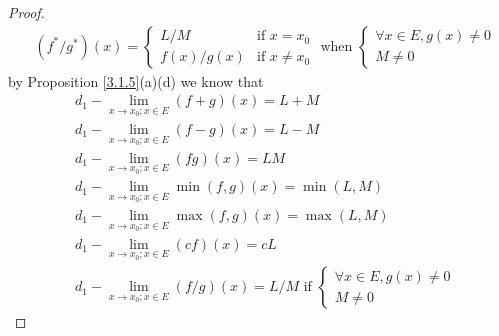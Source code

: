 \begin{proof}
\begin{align*}
                                      & (f^* / g^*)(x) = \begin{cases}
                                                             L / M       & \text{if } x = x_0    \\
                                                             f(x) / g(x) & \text{if } x \neq x_0
                                                         \end{cases} \text{ when } \begin{cases}
                                                                                       \forall x \in E, g(x) \neq 0 \\
                                                                                       M \neq 0
                                                                                   \end{cases}
    \end{align*}
    by Proposition \ref{3.1.5}(a)(d) we know that
    \begin{align*}
         & d_1 - \lim_{x \to x_0 ; x \in E} (f + g)(x) = L + M                                          \\
         & d_1 - \lim_{x \to x_0 ; x \in E} (f - g)(x) = L - M                                          \\
         & d_1 - \lim_{x \to x_0 ; x \in E} (fg)(x) = LM                                                \\
         & d_1 - \lim_{x \to x_0 ; x \in E} \min(f, g)(x) = \min(L, M)                                  \\
         & d_1 - \lim_{x \to x_0 ; x \in E} \max(f, g)(x) = \max(L, M)                                  \\
         & d_1 - \lim_{x \to x_0 ; x \in E} (cf)(x) = cL                                                \\
         & d_1 - \lim_{x \to x_0 ; x \in E} (f / g)(x) = L / M \text{ if } \begin{cases}
                                                                               \forall x \in E, g(x) \neq 0 \\
                                                                               M \neq 0
                                                                           \end{cases}
    \end{align*}
\end{proof}